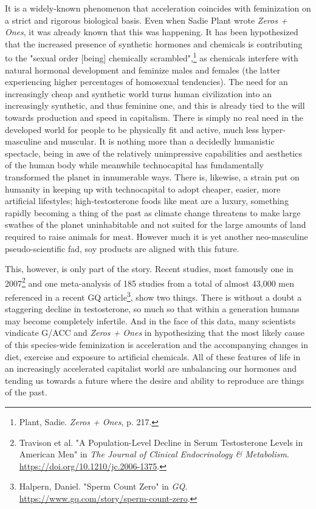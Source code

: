 \documentclass[10pt, statementpaper, twoside, openright]{memoir}
\begin{document}
It is a widely-known phenomenon that acceleration coincides with feminization on a strict and rigorous biological basis. Even when Sadie Plant wrote \textit{Zeros + Ones}, it was already known that this was happening. It has been hypothesized that the increased presence of synthetic hormones and chemicals is contributing to the "sexual order [being] chemically scrambled",\footnote{Plant, Sadie. \textit{Zeros + Ones}, p. 217.} as chemicals interfere with natural hormonal development and feminize males and females (the latter experiencing higher percentages of homosexual tendencies). The need for an increasingly cheap and synthetic world turns human civilization into an increasingly synthetic, and thus feminine one, and this is already tied to the will towards production and speed in capitalism. There is simply no real need in the developed world for people to be physically fit and active, much less hyper-masculine and muscular. It is nothing more than a decidedly humanistic spectacle, being in awe of the relatively unimpressive capabilities and aesthetics of the human body while meanwhile technocapital has fundamentally transformed the planet in innumerable ways. There is, likewise, a strain put on humanity in keeping up with technocapital to adopt cheaper, easier, more artificial lifestyles; high-testosterone foods like meat are a luxury, something rapidly becoming a thing of the past as climate change threatens to make large swathes of the planet uninhabitable and not suited for the large amounts of land required to raise animals for meat. However much it is yet another neo-masculine pseudo-scientific fad, soy products are aligned with this future.

This, however, is only part of the story. Recent studies, most famously one in 2007\footnote{Travison et al. "A Population-Level Decline in Serum Testosterone Levels in American Men" in \textit{The Journal of Clinical Endocrinology \& Metabolism}.\\ \href{https://doi.org/10.1210/jc.2006-1375}{https://doi.org/10.1210/jc.2006-1375}.} and one meta-analysis of 185 studies from a total of almost 43,000 men referenced in a recent GQ article\footnote{Halpern, Daniel. "Sperm Count Zero" in \textit{GQ}.\\ \href{https://www.gq.com/story/sperm-count-zero}{https://www.gq.com/story/sperm-count-zero}.}, show two things. There is without a doubt a staggering decline in testosterone, so much so that within a generation humans may become completely infertile. And in the face of this data, many scientists vindicate G/ACC and \textit{Zeros + Ones} in hypothesizing that the most likely cause of this species-wide feminization is acceleration and the accompanying changes in diet, exercise and exposure to artificial chemicals. All of these features of life in an increasingly accelerated capitalist world are unbalancing our hormones and tending us towards a future where the desire and ability to reproduce are things of the past.
\end{document}
